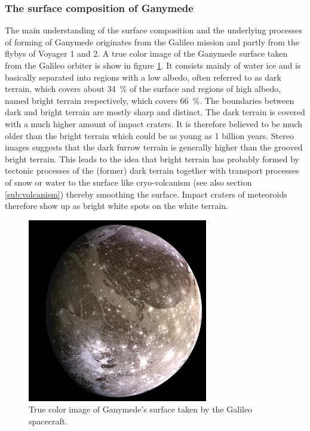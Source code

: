 \subsubsection{The surface composition of Ganymede}

The main understanding of the surface composition and the underlying
processes of forming of Ganymede originates from the Galileo mission
and partly from the flybys of Voyager 1 and 2. A true color image
of the Ganymede surface taken from the Galileo orbiter is show in
figure \ref{fig:Ganymed-true-color}. It consists mainly of water
ice and is basically separated into regions with a low albedo, often
referred to as dark terrain, which covers about 34~\% of the surface
and regions of high albedo, named bright terrain respectively, which
covers 66~\%\cite{bagenal2007jupiter}. The boundaries between dark
and bright terrain are mostly sharp and distinct. The dark terrain
is covered with a much higher amount of impact craters. It is therefore
believed to be much older than the bright terrain which could be as
young as 1 billion years\cite{Showman2004}. Stereo images suggests
that the dark furrow terrain is generally higher than the grooved
bright terrain. This leads to the idea that bright terrain has probably
formed by tectonic processes of the (former) dark terrain together
with transport processes of snow or water to the surface like cryo-volcanism
(see also section \ref{sub:volcanism}) thereby smoothing the surface.
Impact craters of meteoroids therefore show up as bright white spots
on the white terrain\cite{Schenk2001,Patterson2010,bagenal2007jupiter,Showman1997,Showman2004}. 

\begin{figure}
\begin{centering}
\includegraphics[width=0.7\textwidth]{Figures/Ganymede_true_color}
\par\end{centering}

\caption{True color image of Ganymede's surface taken by the Galileo spacecraft.\label{fig:Ganymed-true-color}}


\end{figure}



